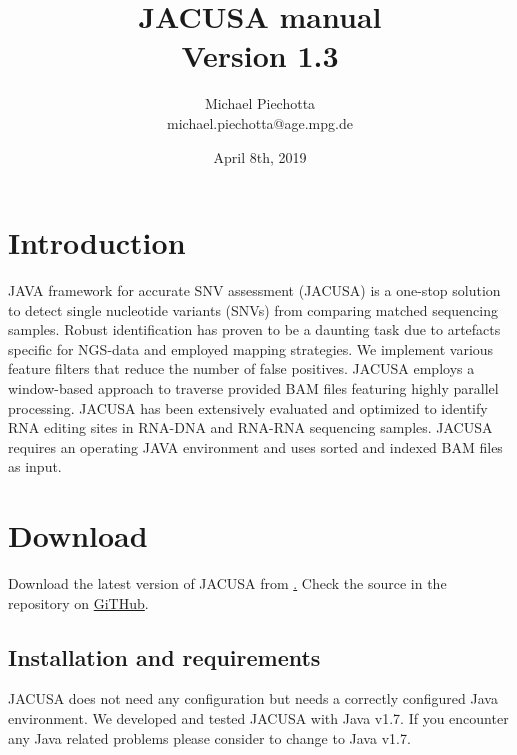 \documentclass[10pt, a4paper]{article}
\title{JACUSA manual \\ Version 1.3}
\author{Michael Piechotta \\ michael.piechotta@age.mpg.de}
\date{April 8th, 2019}
\begin{document}
\maketitle \tableofcontents
\section{Introduction}
JAVA framework for accurate SNV assessment (JACUSA) is a one-stop solution to detect single
nucleotide variants (SNVs) from comparing matched sequencing samples. Robust identification has
proven to be a daunting task due to artefacts specific for NGS-data and employed mapping
strategies. We implement various feature filters that reduce the number of false positives. JACUSA
employs a window-based approach to traverse provided BAM files featuring highly parallel processing.
JACUSA has been extensively evaluated and optimized to identify RNA editing sites in RNA-DNA and
RNA-RNA sequencing samples. JACUSA requires an operating JAVA environment and uses sorted and
indexed BAM files as input.
\section{Download}
Download the latest version of JACUSA from \href{https://github.com/dieterich-lab/JACUSA/releases/download/1.3.0/JACUSA_v1.3.0.jar}. 
Check the source in the repository on \href{https://github.com/dieterich-lab/JACUSA}{GiTHub}.
\subsection{Installation and requirements}
JACUSA does not need any configuration but needs a correctly configured Java environment.
We developed and tested JACUSA with Java v1.7. If you encounter any Java related problems please
consider to change to Java v1.7.
\end{document}
